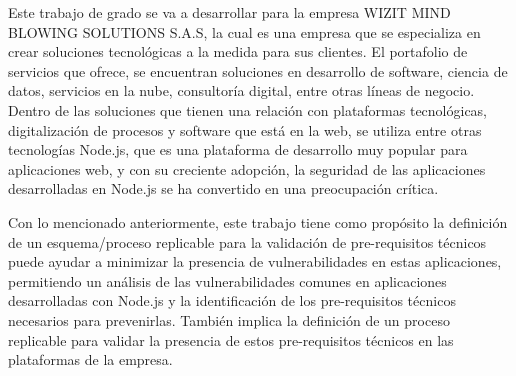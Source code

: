 Este trabajo de grado se va a desarrollar para la empresa WIZIT MIND BLOWING SOLUTIONS S.A.S, la cual es una empresa que se especializa en crear soluciones tecnológicas a la medida para sus clientes. El portafolio de servicios que ofrece, se encuentran soluciones en desarrollo de software, ciencia de datos, servicios en la nube, consultoría digital, entre otras líneas de negocio. Dentro de las soluciones que tienen una relación con plataformas tecnológicas, digitalización de procesos y software que está en la web, se utiliza entre otras tecnologías Node.js, que es una plataforma de desarrollo muy popular para aplicaciones web, y con su creciente adopción, la seguridad de las aplicaciones desarrolladas en Node.js se ha convertido en una preocupación crítica. 


Con lo mencionado anteriormente, este trabajo tiene como propósito la definición de un esquema/proceso replicable para la validación de pre-requisitos técnicos puede ayudar a minimizar la presencia de vulnerabilidades en estas aplicaciones, permitiendo un análisis de las vulnerabilidades comunes en aplicaciones desarrolladas con Node.js y la identificación de los pre-requisitos técnicos necesarios para prevenirlas. También implica la definición de un proceso replicable para validar la presencia de estos pre-requisitos técnicos en las plataformas de la empresa.



